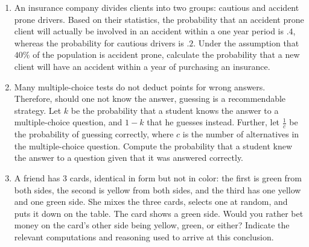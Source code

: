 \documentclass{article}
\begin{document}
\begin{enumerate}
	\item An insurance company divides clients into two groups: cautious and accident prone drivers. Based on their statistics, the probability that an accident prone client will actually be involved in an accident within a one year period is $.4$, whereas the probability for cautious drivers is $.2$. Under the assumption that $40\%$ of the population is accident prone, calculate the probability that a new client will have an accident within a year of purchasing an insurance.
	\item Many multiple-choice tests do not deduct points for wrong answers. Therefore, should one not know the answer, guessing is a recommendable strategy. Let $k$ be the probability that a student knows the answer to a multiple-choice question, and $1-k$ that he guesses instead. Further, let $\frac{1}{c}$ be the probability of guessing correctly, where $c$ is the number of alternatives in the multiple-choice question. Compute the probability that a student knew the answer to a question given that it was answered correctly.
	\item A friend has 3 cards, identical in form but not in color: the first is green from both sides, the second is yellow from both sides, and the third has one yellow and one green side. She mixes the three cards, selects one at random, and puts it down on the table. The card shows a green side. Would you rather bet money on the card's other side being yellow, green, or either? Indicate the relevant computations and reasoning used to arrive at this conclusion.

\end{enumerate}		
\end{document}
